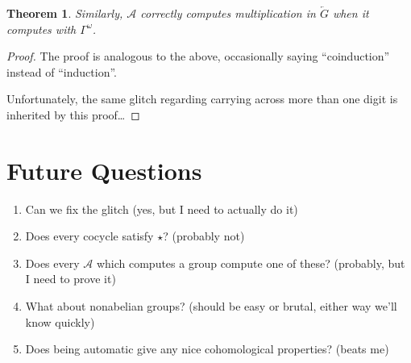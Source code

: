 \documentclass[12pt]{article}
\newtheorem{thm}{Theorem}
\theoremstyle{definition}
\begin{document}
  \begin{thm}
    Similarly, $\mathcal{A}$ correctly computes multiplication in 
    $\overleftarrow{G}$ when it computes with $\Gamma^\omega$.
  \end{thm}

  \begin{proof}
    The proof is analogous to the above, occasionally saying ``coinduction''
    instead of ``induction''.

    Unfortunately, the same glitch regarding carrying across more than one
    digit is inherited by this proof\ldots
  \end{proof}

  \section{Future Questions}
    \begin{enumerate}
      \item Can we fix the glitch (yes, but I need to actually do it)
      \item Does every cocycle satisfy $\star$? (probably not)
      \item Does every $\mathcal{A}$ which computes 
        a group compute one of these? (probably, but I need to prove it)
      \item What about nonabelian groups? (should be easy or brutal, either way we'll know quickly)
      \item Does being automatic give any nice cohomological properties? (beats me)
    \end{enumerate}
\end{document}
